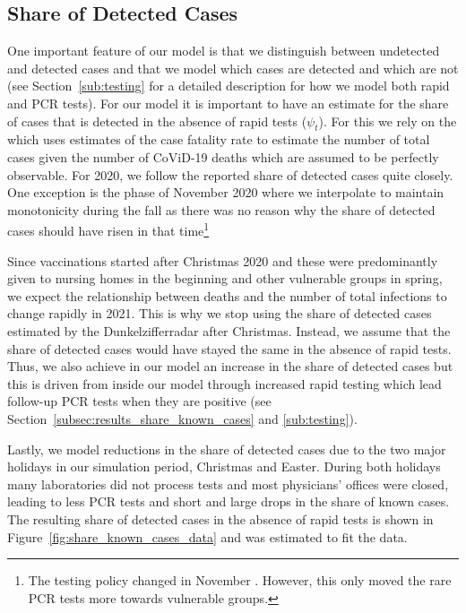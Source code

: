 \subsection{Share of Detected Cases}
\label{subsec:data_share_known_cases}

One important feature of our model is that we distinguish between undetected and detected
cases and that we model which cases are detected and which are not (see
Section~\ref{sub:testing} for a detailed description for how we model both rapid and PCR
tests). For our model it is important to have an estimate for the share of cases that is
detected in the absence of rapid tests ($\psi_t$). For this we rely on the
\cite[Dunkelzifferradar Project][]{Dunkelzifferradar2020} which uses estimates of the
case fatality rate to estimate the number of total cases given the number of CoViD-19
deaths which are assumed to be perfectly observable. For 2020, we follow the reported
share of detected cases quite closely. One exception is the phase of November 2020 where
we interpolate to maintain monotonicity during the fall as there was no reason why the
share of detected cases should have risen in that time\footnote{The testing policy
changed in November \citep{RKI2020a}. However, this only moved the rare PCR tests more
towards vulnerable groups.}

Since vaccinations started after Christmas 2020 and these were predominantly given to
nursing homes in the beginning and other vulnerable groups in spring, we expect the
relationship between deaths and the number of total infections to change rapidly in 2021.
This is why we stop using the share of detected cases estimated by the Dunkelzifferradar
after Christmas. Instead, we assume that the share of detected cases would have stayed
the same in the absence of rapid tests. Thus, we also achieve in our model an increase in
the share of detected cases but this is driven from inside our model through increased
rapid testing which lead follow-up PCR tests when they are positive (see
Section~\ref{subsec:results_share_known_cases} and \ref{sub:testing}).

Lastly, we model reductions in the share of detected cases due to the two major holidays in our
simulation period, Christmas and Easter. During both holidays many laboratories did not
process tests and most physicians' offices were closed, leading to less PCR tests and
short and large drops in the share of known cases. The resulting share of detected cases
in the absence of rapid tests is shown in Figure~\ref{fig:share_known_cases_data} and
was estimated to fit the data.

